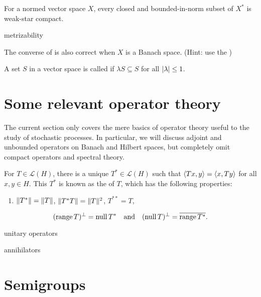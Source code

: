 \begin{namedthm} \label{thm:Banach-Alaoglu}
    For a normed vector space $X$, every closed and bounded-in-norm subset of $X^*$ is weak-star compact.
\end{namedthm}

metrizability

\begin{xca}
    The converse of  is also correct when $X$ is a Banach space. (Hint: use the )
\end{xca}

A set $S$ in a vector space is called  if $\lambda S \subseteq S$ for all $\lvert \lambda \rvert \leq 1$.

\section{Some relevant operator theory}

The current section only covers the mere basics of operator theory useful to the study of stochastic processes. In particular, we will discuss adjoint and unbounded operators on Banach and Hilbert spaces, but completely omit compact operators and spectral theory.

\begin{thm}
    For $T \in \mathcal L(H)$, there is a unique $T^* \in \mathcal L(H)$ such that $\langle Tx, y \rangle = \langle x, Ty \rangle$ for all $x,y\in H$. This $T^*$ is known as the  of $T$, which has the following properties:
    \begin{enumerate}
        \item $\lVert T^* \rVert = \lVert T \rVert$, $\lVert T^*T \rVert = \lVert T \rVert^2$, $T^{**} = T$, 
    \end{enumerate}
\end{thm}

\[
    (\operatorname{range} T)^{\perp} = \operatorname{null} T^* \quad \text{and} \quad (\operatorname{null} T)^{\perp} = \overline{\operatorname{range} T^*}.
\]

unitary operators

annihilators

\begin{namedthm}
    
\end{namedthm}

\section{Semigroups}

